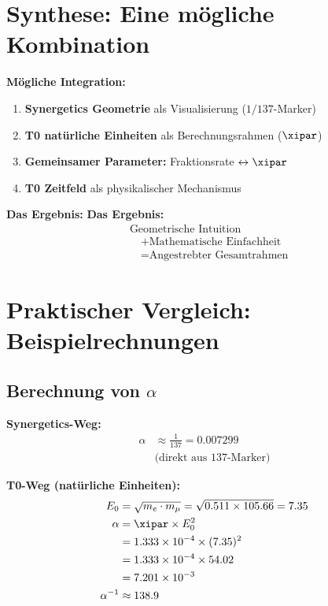 	\section{Synthese: Eine mögliche Kombination}
	
	\begin{gemeinsam}
		\textbf{Mögliche Integration:}
		
		\begin{enumerate}
			\item \textbf{Synergetics Geometrie} als Visualisierung ($1/137$-Marker)
			\item \textbf{T0 natürliche Einheiten} als Berechnungsrahmen ($\xipar$)
			\item \textbf{Gemeinsamer Parameter:} Fraktionsrate $\leftrightarrow \xipar$
			\item \textbf{T0 Zeitfeld} als physikalischer Mechanismus
		\end{enumerate}
		
		\textbf{Das Ergebnis:}
\textbf{Das Ergebnis:}
\begin{equation}
	\boxed{
		\begin{aligned}
			&\text{Geometrische Intuition} \\
			&\quad + \text{Mathematische Einfachheit} \\
			&\quad = \text{Angestrebter Gesamtrahmen}
		\end{aligned}
	}
\end{equation}
	\end{gemeinsam}
	
	\section{Praktischer Vergleich: Beispielrechnungen}
	
	\subsection{Berechnung von $\alpha$}
	
	\textbf{Synergetics-Weg:}
	\begin{align}
		\alpha &\approx \frac{1}{137} = 0.007299 \\
		&\text{(direkt aus 137-Marker)}
	\end{align}
	
	\textbf{T0-Weg (natürliche Einheiten):}
	\begin{align}
		E_0 &= \sqrt{m_e \cdot m_\mu} = \sqrt{0.511 \times 105.66} = 7.35 \\
		\alpha &= \xipar \times E_0^2 \\
		&= 1.333 \times 10^{-4} \times (7.35)^2 \\
		&= 1.333 \times 10^{-4} \times 54.02 \\
		&= 7.201 \times 10^{-3} \\
		\alpha^{-1} &\approx 138.9
	\end{align}

